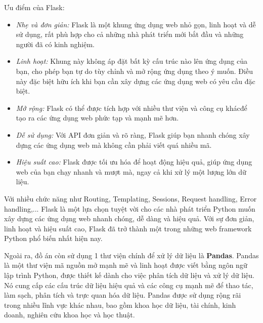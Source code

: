 Ưu điểm của Flask:
\begin{itemize}
    \item \textit{Nhẹ và đơn giản:} Flask là một khung ứng dụng web nhỏ gọn, linh hoạt và dễ sử dụng, rất phù hợp cho cả những nhà phát triển mới bắt đầu và những người đã có kinh nghiệm.
    \item \textit{Linh hoạt:} Khung này không áp đặt bất kỳ cấu trúc nào lên ứng dụng của bạn, cho phép bạn tự do tùy chỉnh và mở rộng ứng dụng theo ý muốn. Điều này đặc biệt hữu ích khi bạn cần xây dựng các ứng dụng web có yêu cầu đặc biệt.
    \item \textit{Mở rộng:} Flask có thể được tích hợp với nhiều thư viện và công cụ khácđể tạo ra các ứng dụng web phức tạp và mạnh mẽ hơn.
    \item \textit{Dễ sử dụng:} Với API đơn giản và rõ ràng, Flask giúp bạn nhanh chóng xây dựng các ứng dụng web mà không cần phải viết quá nhiều mã.
    \item \textit{Hiệu suất cao:} Flask được tối ưu hóa để hoạt động hiệu quả, giúp ứng dụng web của bạn chạy nhanh và mượt mà, ngay cả khi xử lý một lượng lớn dữ liệu.
\end{itemize}

Với nhiều chức năng như Routing, Templating, Sessions, Request handling, Error handling,... Flask là một lựa chọn tuyệt vời cho các nhà phát triển Python muốn xây dựng các ứng dụng web nhanh chóng, dễ dàng và hiệu quả. Với sự đơn giản, linh hoạt và hiệu suất cao, Flask đã trở thành một trong những web framework Python phổ biến nhất hiện nay.

Ngoài ra, đồ án còn sử dụng 1 thư viện chính để xử lý dữ liệu là \textbf{Pandas}. Pandas là một thư viện mã nguồn mở mạnh mẽ và linh hoạt được viết bằng ngôn ngữ lập trình Python, được thiết kế dành cho việc phân tích dữ liệu và xử lý dữ liệu. Nó cung cấp các cấu trúc dữ liệu hiệu quả và các công cụ mạnh mẽ để thao tác, làm sạch, phân tích và trực quan hóa dữ liệu. Pandas được sử dụng rộng rãi trong nhiều lĩnh vực khác nhau, bao gồm khoa học dữ liệu, tài chính, kinh doanh, nghiên cứu khoa học và học thuật.

